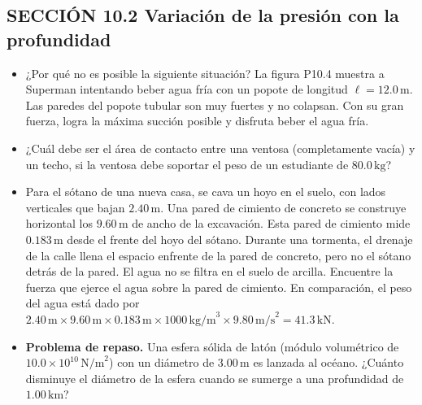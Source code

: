 \documentclass[11pt,a4paper]{article}
\begin{document}
\newpage

\subsection*{SECCIÓN 10.2 Variación de la presión con la profundidad}

\begin{itemize}
    \item[\textbf{4.}] ¿Por qué no es posible la siguiente situación? La figura P10.4 muestra a Superman intentando beber agua fría con un popote de longitud \(\ell = 12.0\,\text{m}\). Las paredes del popote tubular son muy fuertes y no colapsan. Con su gran fuerza, logra la máxima succión posible y disfruta beber el agua fría.
    
    \vspace*{6cm}
    
    \item[\textbf{5.}] ¿Cuál debe ser el área de contacto entre una ventosa (completamente vacía) y un techo, si la ventosa debe soportar el peso de un estudiante de \(80.0\,\text{kg}\)?
    \vspace*{6cm}
    
    \item[\textbf{6.}] Para el sótano de una nueva casa, se cava un hoyo en el suelo, con lados verticales que bajan \(2.40\,\text{m}\). Una pared de cimiento de concreto se construye horizontal los \(9.60\,\text{m}\) de ancho de la excavación. Esta pared de cimiento mide \(0.183\,\text{m}\) desde el frente del hoyo del sótano. Durante una tormenta, el drenaje de la calle llena el espacio enfrente de la pared de concreto, pero no el sótano detrás de la pared. El agua no se filtra en el suelo de arcilla. Encuentre la fuerza que ejerce el agua sobre la pared de cimiento. En comparación, el peso del agua está dado por \(2.40\,\text{m} \times 9.60\,\text{m} \times 0.183\,\text{m} \times 1000\,\text{kg/m}^3 \times 9.80\,\text{m/s}^2 = 41.3\,\text{kN}\).
    \vspace*{7cm}
    
    \item[\textbf{7.}] \textbf{Problema de repaso.} Una esfera sólida de latón (módulo volumétrico de \(10.0 \times 10^{10}\,\text{N/m}^2\)) con un diámetro de \(3.00\,\text{m}\) es lanzada al océano. ¿Cuánto disminuye el diámetro de la esfera cuando se sumerge a una profundidad de \(1.00\,\text{km}\)?
    \vspace*{7cm}
\end{itemize}
\end{document}
